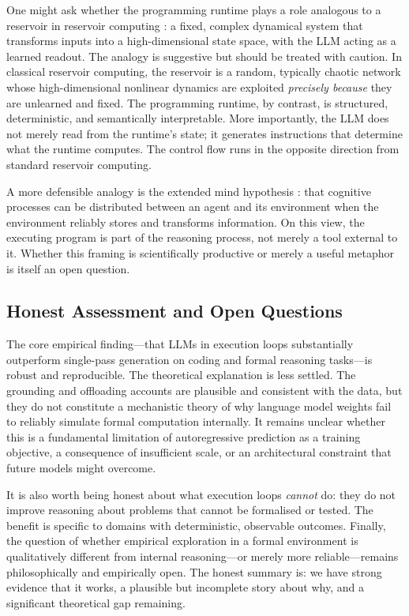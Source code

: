 \documentclass[10.5pt]{article}
\begin{document}
One might ask whether the programming runtime plays a role analogous to a
reservoir in reservoir computing \cite{jaeger2001,maass2002}: a fixed, complex
dynamical system that transforms inputs into a high-dimensional state space,
with the LLM acting as a learned readout. The analogy is suggestive but should
be treated with caution. In classical reservoir computing, the reservoir is a
random, typically chaotic network whose high-dimensional nonlinear dynamics are
exploited \emph{precisely because} they are unlearned and fixed. The programming
runtime, by contrast, is structured, deterministic, and semantically
interpretable. More importantly, the LLM does not merely read from the runtime's
state; it generates instructions that determine what the runtime computes. The
control flow runs in the opposite direction from standard reservoir computing.

A more defensible analogy is the extended mind hypothesis \cite{clark1998}: that
cognitive processes can be distributed between an agent and its environment when
the environment reliably stores and transforms information. On this view, the
executing program is part of the reasoning process, not merely a tool external
to it. Whether this framing is scientifically productive or merely a useful
metaphor is itself an open question.

\subsection*{Honest Assessment and Open Questions}

The core empirical finding---that LLMs in execution loops substantially
outperform single-pass generation on coding and formal reasoning tasks---is
robust and reproducible. The theoretical explanation is less settled. The
grounding and offloading accounts are plausible and consistent with the data,
but they do not constitute a mechanistic theory of why language model weights
fail to reliably simulate formal computation internally. It remains unclear
whether this is a fundamental limitation of autoregressive prediction as a
training objective, a consequence of insufficient scale, or an architectural
constraint that future models might overcome.

It is also worth being honest about what execution loops \emph{cannot} do: they
do not improve reasoning about problems that cannot be formalised or tested.
The benefit is specific to domains with deterministic, observable outcomes.
Finally, the question of whether empirical exploration in a formal environment
is qualitatively different from internal reasoning---or merely more
reliable---remains philosophically and empirically open. The honest summary is:
we have strong evidence that it works, a plausible but incomplete story about
why, and a significant theoretical gap remaining.
\end{document}
